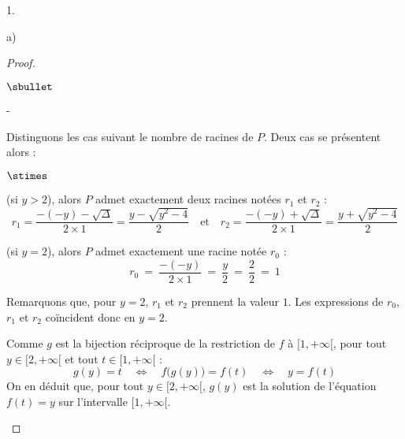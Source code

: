 \documentclass[11pt]{article}%
\begin{document}
\begin{noliste}{1.}
\begin{noliste}{a)}
\begin{proof}
\begin{noliste}{$\sbullet$}
\begin{noliste}{-}
        \item Distinguons les cas suivant le nombre de racines de
          $P$. Deux cas se présentent alors :
        \end{noliste}
        \begin{liste}{$\stimes$}
        \item {} (\ie si $y>2$), alors $P$ admet exactement
          deux racines notées $r_1$ et $r_2$ :
          \[
            r_1 = \dfrac{-(-y) - \sqrt{\Delta}}{2 \times 1} =
            \dfrac{y- \sqrt{y^2 - 4}}{2} \quad \text{et} \quad r_2 =
            \dfrac{-(-y) + \sqrt{\Delta}}{2 \times 1} = \dfrac{y+
              \sqrt{y^2 -4}}{2}
          \]
        \item {} (\ie si $y=2$), alors $P$ admet exactement
          une racine notée $r_0$ :
          \[
            r_0 \ = \ \dfrac{-(-y)}{2 \times 1} \ = \ \dfrac{y}{2} \ =
            \ \dfrac{2}{2} \ = \ 1
          \]
        \end{liste}
      \begin{remark}
        Remarquons que, pour $y=2$, $r_1$ et $r_2$ prennent la valeur $1$. Les
        expressions de $r_0$, $r_1$ et $r_2$ coïncident donc en $y=2$.
      \end{remark}


      \newpage
      
      
      \item Comme $g$ est la bijection réciproque de la restriction de
        $f$ à $[1,+\infty[$, pour tout $y \in [2,+\infty[$ et tout $t
        \in [1,+\infty[$ :
        \[
          g(y) = t \quad \Leftrightarrow \quad f\big(g(y)\big) = f(t) \quad
          \Leftrightarrow \quad y = f(t)
        \]
        On en déduit que, pour tout $y \in [2,+\infty[$, $g(y)$ est
        la solution de l'équation $f(t)=y$ sur l'intervalle
        $[1,+\infty[$.





\end{noliste}
\end{proof}
\end{noliste}
\end{noliste}
\end{document}
